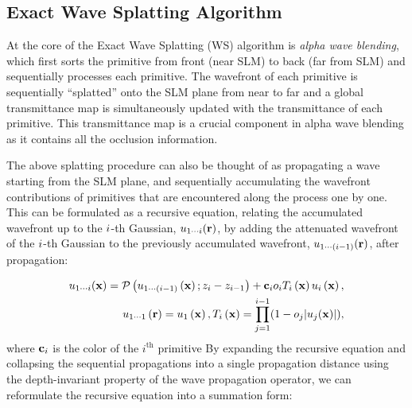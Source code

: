 \subsection{Exact Wave Splatting Algorithm}
\label{subsec:full_ws}
At the core of the Exact Wave Splatting (WS) algorithm is \textit{alpha wave blending}, which first sorts the primitive from front (near SLM) to back (far from SLM) and sequentially processes each primitive. The wavefront of each primitive is sequentially ``splatted'' onto the SLM plane from near to far and a global transmittance map is simultaneously updated with the transmittance of each primitive. This transmittance map is a crucial component in alpha wave blending as it contains all the occlusion information. 


The above splatting procedure can also be thought of as propagating a wave starting from the SLM plane, and sequentially accumulating the wavefront contributions of primitives that are encountered along the process one by one. This can be formulated as a recursive equation, relating the accumulated wavefront up to the $i$-th Gaussian, $u_{1 \cdots i} (\mathbf{r})$, by adding the attenuated wavefront of the $i$-th Gaussian to the previously accumulated wavefront, $u_{1 \cdots (i -1)} (\mathbf{r})$, after propagation:

\begin{align}
u_{1 \cdots i} (\mathbf{x}) = \mathcal{P}\left(u_{1 \cdots (i-1)}\left(\mathbf{x}\right) ; z_{i} - z_{i-1}\right) + \mathbf{c}_i o_i T_i\left(\mathbf{x}\right)  u_i\left(\mathbf{x}\right) , \\ u_{1 \cdots 1}\left(\mathbf{r}\right) = u_1\left(\mathbf{x}\right), T_i\left(\mathbf{x}\right) = \prod_{j=1}^{i-1} (1 - o_{j} |u_j(\mathbf{x})|),
\end{align} %
where $\mathbf{c}_i$ is the color of the $i^\text{th}$ primitive By expanding the recursive equation and collapsing the sequential propagations into a single propagation distance using the depth-invariant property of the wave propagation operator, we can reformulate the recursive equation into a summation form: %



